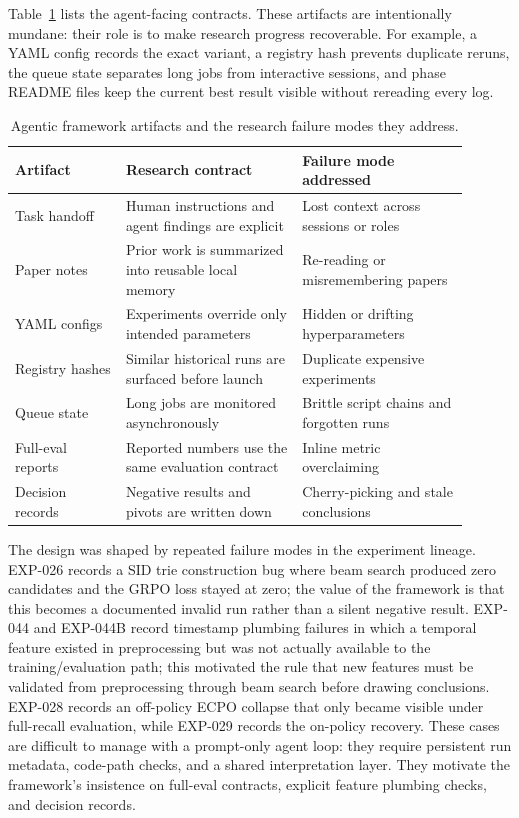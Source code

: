 \documentclass[11pt]{article}
\begin{document}
Table~\ref{tab:agentic-artifacts} lists the agent-facing contracts. These artifacts are intentionally mundane: their role is to make research progress recoverable. For example, a YAML config records the exact variant, a registry hash prevents duplicate reruns, the queue state separates long jobs from interactive sessions, and phase README files keep the current best result visible without rereading every log.

\begin{table}[t]
\centering
\caption{Agentic framework artifacts and the research failure modes they address.}
\label{tab:agentic-artifacts}
\begin{tabular}{p{0.22\linewidth}p{0.35\linewidth}p{0.33\linewidth}}
\toprule
Artifact & Research contract & Failure mode addressed \\
\midrule
Task handoff & Human instructions and agent findings are explicit & Lost context across sessions or roles \\
Paper notes & Prior work is summarized into reusable local memory & Re-reading or misremembering papers \\
YAML configs & Experiments override only intended parameters & Hidden or drifting hyperparameters \\
Registry hashes & Similar historical runs are surfaced before launch & Duplicate expensive experiments \\
Queue state & Long jobs are monitored asynchronously & Brittle script chains and forgotten runs \\
Full-eval reports & Reported numbers use the same evaluation contract & Inline metric overclaiming \\
Decision records & Negative results and pivots are written down & Cherry-picking and stale conclusions \\
\bottomrule
\end{tabular}
\end{table}

The design was shaped by repeated failure modes in the experiment lineage. EXP-026 records a SID trie construction bug where beam search produced zero candidates and the GRPO loss stayed at zero; the value of the framework is that this becomes a documented invalid run rather than a silent negative result. EXP-044 and EXP-044B record timestamp plumbing failures in which a temporal feature existed in preprocessing but was not actually available to the training/evaluation path; this motivated the rule that new features must be validated from preprocessing through beam search before drawing conclusions. EXP-028 records an off-policy ECPO collapse that only became visible under full-recall evaluation, while EXP-029 records the on-policy recovery. These cases are difficult to manage with a prompt-only agent loop: they require persistent run metadata, code-path checks, and a shared interpretation layer. They motivate the framework's insistence on full-eval contracts, explicit feature plumbing checks, and decision records.
\end{document}
